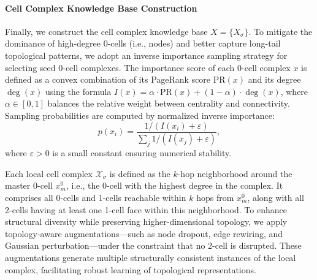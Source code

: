 \paragraph{Cell Complex Knowledge Base Construction} 
Finally, we construct the cell complex knowledge base \(X = \{ X_{\sigma} \}\). To mitigate the dominance of high-degree 0-cells (i.e., nodes) and better capture long-tail topological patterns, we adopt an inverse importance sampling strategy for selecting seed 0-cell complexes. The importance score of each 0-cell complex \(x\) is defined as a convex combination of its PageRank score \(\mathrm{PR}(x)\) and its degree \(\deg(x)\) using the formula $
    I(x) = \alpha \cdot \mathrm{PR}(x) + (1 - \alpha) \cdot \deg(x)
$, 
where \(\alpha \in [0,1]\) balances the relative weight between centrality and connectivity. 
Sampling probabilities are computed by normalized
inverse importance:
\begin{equation}
    p(x_i) = \frac{1 / (I(x_i) + \varepsilon)}{\sum_j 1 / (I(x_j) + \varepsilon)},
\end{equation}
where \(\varepsilon > 0\) is a small constant ensuring numerical stability.

Each local cell complex $\mathcal{X}_\sigma$ is defined as the $k$-hop neighborhood around the master 0-cell $x_m^0$, i.e., the 0-cell with the highest degree in the complex. It comprises all 0-cells and 1-cells reachable within $k$ hops from $x_m^0$, along with all 2-cells having at least one 1-cell face within this neighborhood. 
To enhance structural diversity while preserving higher-dimensional topology, we apply topology-aware augmentations—such as node dropout, edge rewiring, and Gaussian perturbation—under the constraint that no 2-cell is disrupted. %
These augmentations generate multiple structurally consistent instances of the local complex, facilitating robust learning of topological representations. 

